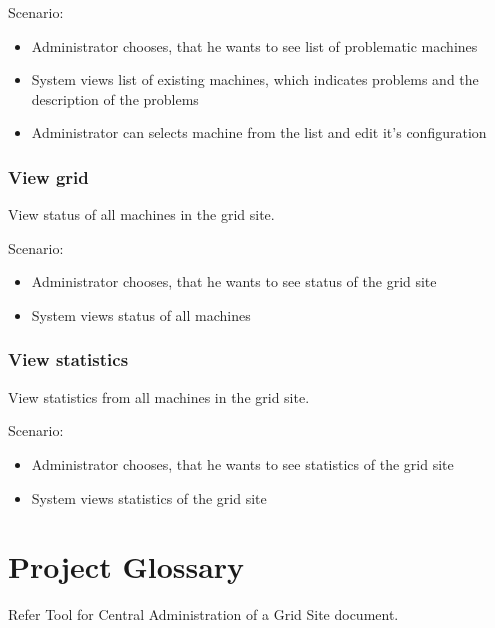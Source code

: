 \documentclass[12pt]{article}
\begin{document}
Scenario:
\begin{itemize}
\item{Administrator chooses, that he wants to see list of problematic machines}
\item{System views list of existing machines, which indicates problems and the description of the problems}
\item{Administrator can selects machine from the list and edit it's configuration}
\end{itemize}

\subsubsection{View grid}
View status of all machines in the grid site.

Scenario:
\begin{itemize}
\item{Administrator chooses, that he wants to see status of the grid site}
\item{System views status of all machines}
\end{itemize}

\subsubsection{View statistics}
View statistics from all machines in the grid site.

Scenario:
\begin{itemize}
\item{Administrator chooses, that he wants to see statistics of the grid site}
\item{ System views statistics of the grid site}
\end{itemize}

\section{Project Glossary}

Refer Tool for Central Administration of a Grid Site document.
\end{document}
